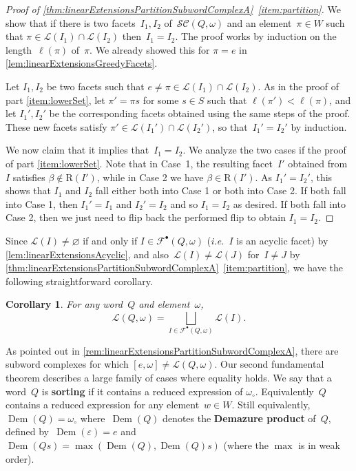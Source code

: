 \documentclass[reqno]{amsart}
\newtheorem{corollary}[theorem]{Corollary}
\theoremstyle{definition}
\DeclareMathOperator{\DemazureProduct}{Dem} %
\newcommand{\ie}{\textit{i.e.}~} %
\newcommand{\defn}[1]{\textbf{\textsf{\color{PineGreen} #1}}} %
\newcommand{\linearExtensions}{\mathcal{L}} %
\newcommand{\wo}{\omega_\circ} %
\newcommand{\subwordComplex}{\mathcal{SC}} %
\newcommand{\Roots}{\mathrm{R}} %
\newcommand{\subwordAcyclicFacets}{\mathcal{F}^\bullet} %
\begin{document}
\begin{proof}[Proof of \cref{thm:linearExtensionsPartitionSubwordComplexA}~\eqref{item:partition}]
We show that if there is two facets~$I_1, I_2$ of~$\subwordComplex(Q, \omega)$ and an element~$\pi \in W$ such that $\pi \in \linearExtensions(I_1) \cap \linearExtensions(I_2)$ then~$I_1= I_2$.
The proof works by induction on the length~$\ell(\pi)$ of~$\pi$.
We already showed this for $\pi = e$ in \cref{lem:linearExtensionsGreedyFacets}.

Let $I_1, I_2$ be two facets such that $e \neq \pi \in \linearExtensions(I_1)\cap \linearExtensions(I_2)$.
As in the proof of part \eqref{item:lowerSet}, let $\pi'=\pi s$ for some $s\in S$ such that $\ell(\pi')<\ell(\pi)$, and let $I_1',I_2'$ be the corresponding facets obtained using the same steps of the proof.
These new facets satisfy $\pi' \in \linearExtensions(I_1')\cap \linearExtensions(I_2')$, so that~$I_1' = I_2'$ by induction.

We now claim that it implies that~$I_1 = I_2$.
We analyze the two cases if the proof of part \eqref{item:lowerSet}.
Note that in Case~1, the resulting facet~$I'$ obtained from $I$ satisfies $\beta\notin \Roots(I')$, while in Case 2 we have $\beta \in \Roots(I')$. 
As $I_1' = I_2'$, this shows that $I_1$ and $I_2$ fall either both into Case 1 or both into Case 2.
If both fall into Case 1, then $I_1'=I_1$ and $I_2'=I_2$ and so $I_1=I_2$ as desired.
If both fall into Case 2, then we just need to flip back the performed flip to obtain $I_1=I_2$.
\end{proof}

Since $\linearExtensions(I)\neq \varnothing$ if and only if $I\in \subwordAcyclicFacets(Q,\omega)$ (\ie $I$ is an acyclic facet) by \cref{lem:linearExtensionsAcyclic}, and also~$\linearExtensions(I) \ne \linearExtensions(J)$ for~$I \ne J$ by \cref{thm:linearExtensionsPartitionSubwordComplexA}~\eqref{item:partition}, we have the following straightforward corollary.

\begin{corollary}
\label{coro:linearExtensionsPartitionSubwordComplexes}
For any word~$Q$ and element~$\omega$,
\[
\linearExtensions(Q,\omega) = \bigsqcup_{I\in\subwordAcyclicFacets(Q,\omega)} \linearExtensions(I).
\]
\end{corollary}

As pointed out in \cref{rem:linearExtensionsPartitionSubwordComplexA}, there are subword complexes for which $[e,\omega] \neq \linearExtensions(Q,\omega)$.
Our second fundamental theorem describes a large family of cases where equality holds.
We say that a word~$Q$ is \defn{sorting} if it contains a reduced expression of $\wo$.
Equivalently~$Q$ contains a reduced expression for any element~$w \in W$.
Still equivalently, $\DemazureProduct(Q) = \wo$ where~$\DemazureProduct(Q)$ denotes the \defn{Demazure product} of~$Q$, defined by~$\DemazureProduct(\varepsilon) = e$ and~$\DemazureProduct(Qs) = \max(\DemazureProduct(Q), \DemazureProduct(Q)s)$ (where the $\max$ is in weak order).
\end{document}

